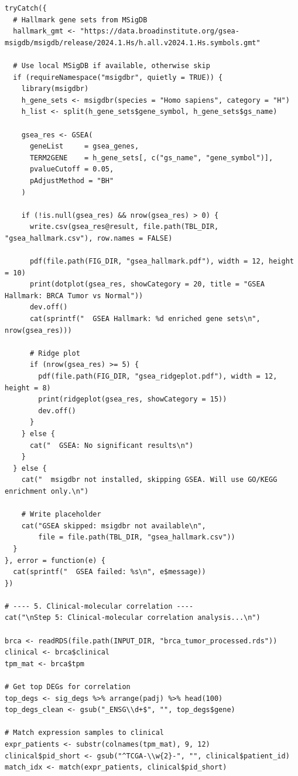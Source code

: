 \documentclass[12pt,a4paper]{ctexart}
\begin{document}
\begin{lstlisting}[caption={07_association_analysis}, basicstyle=\ttfamily\scriptsize]
tryCatch({
  # Hallmark gene sets from MSigDB
  hallmark_gmt <- "https://data.broadinstitute.org/gsea-msigdb/msigdb/release/2024.1.Hs/h.all.v2024.1.Hs.symbols.gmt"

  # Use local MSigDB if available, otherwise skip
  if (requireNamespace("msigdbr", quietly = TRUE)) {
    library(msigdbr)
    h_gene_sets <- msigdbr(species = "Homo sapiens", category = "H")
    h_list <- split(h_gene_sets$gene_symbol, h_gene_sets$gs_name)

    gsea_res <- GSEA(
      geneList     = gsea_genes,
      TERM2GENE    = h_gene_sets[, c("gs_name", "gene_symbol")],
      pvalueCutoff = 0.05,
      pAdjustMethod = "BH"
    )

    if (!is.null(gsea_res) && nrow(gsea_res) > 0) {
      write.csv(gsea_res@result, file.path(TBL_DIR, "gsea_hallmark.csv"), row.names = FALSE)

      pdf(file.path(FIG_DIR, "gsea_hallmark.pdf"), width = 12, height = 10)
      print(dotplot(gsea_res, showCategory = 20, title = "GSEA Hallmark: BRCA Tumor vs Normal"))
      dev.off()
      cat(sprintf("  GSEA Hallmark: %d enriched gene sets\n", nrow(gsea_res)))

      # Ridge plot
      if (nrow(gsea_res) >= 5) {
        pdf(file.path(FIG_DIR, "gsea_ridgeplot.pdf"), width = 12, height = 8)
        print(ridgeplot(gsea_res, showCategory = 15))
        dev.off()
      }
    } else {
      cat("  GSEA: No significant results\n")
    }
  } else {
    cat("  msigdbr not installed, skipping GSEA. Will use GO/KEGG enrichment only.\n")

    # Write placeholder
    cat("GSEA skipped: msigdbr not available\n",
        file = file.path(TBL_DIR, "gsea_hallmark.csv"))
  }
}, error = function(e) {
  cat(sprintf("  GSEA failed: %s\n", e$message))
})

# ---- 5. Clinical-molecular correlation ----
cat("\nStep 5: Clinical-molecular correlation analysis...\n")

brca <- readRDS(file.path(INPUT_DIR, "brca_tumor_processed.rds"))
clinical <- brca$clinical
tpm_mat <- brca$tpm

# Get top DEGs for correlation
top_degs <- sig_degs %>% arrange(padj) %>% head(100)
top_degs_clean <- gsub("_ENSG\\d+$", "", top_degs$gene)

# Match expression samples to clinical
expr_patients <- substr(colnames(tpm_mat), 9, 12)
clinical$pid_short <- gsub("^TCGA-\\w{2}-", "", clinical$patient_id)
match_idx <- match(expr_patients, clinical$pid_short)


\end{lstlisting}
\end{document}
